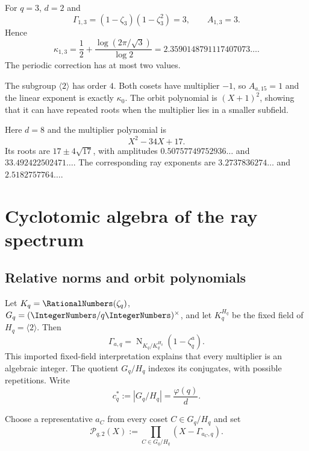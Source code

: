 \documentclass[11pt,oneside]{article}
\theoremstyle{definition}
\theoremstyle{remark}
\newcommand{\FieldNorm}{\operatorname{N}}
\begin{document}
\begin{example}
For $q=3$, $d=2$ and
\[
 \Gamma_{1,3}=(1-\zeta_3)(1-\zeta_3^2)=3,
 \qquad A_{1,3}=3.
\]
Hence
\[
 \kappa_{1,3}=\frac12+\frac{\log(2\pi/\sqrt3)}{\log2}
 =2.3590148791117407073\ldots.
\]
The periodic correction has at most two values.
\end{example}

\begin{example}[A neutral cycle at $q=15$]
The subgroup $\langle2\rangle$ has order $4$. Both cosets have multiplier $-1$,
so $A_{a,15}=1$ and the linear exponent is exactly $\kappa_0$. The orbit polynomial
is $(X+1)^2$, showing that it can have repeated roots when the multiplier lies in
a smaller subfield.
\end{example}

\begin{example}[The first visible split at $q=17$]
Here $d=8$ and the multiplier polynomial is
\[
 X^2-34X+17.
\]
Its roots are $17\pm4\sqrt{17}$, with amplitudes
$0.50757749752936\ldots$ and $33.492422502471\ldots$. The corresponding ray
exponents are $3.2737836274\ldots$ and $2.5182757764\ldots$.
\end{example}

\section{Cyclotomic algebra of the ray spectrum}\label{p2:sec:cyclotomic-algebra}

\subsection{Relative norms and orbit polynomials}

Let $K_q=\RationalNumbers(\zeta_q)$, $G_q=(\IntegerNumbers/q\IntegerNumbers)^\times$, and let $K_q^{H_q}$ be the fixed
field of $H_q=\langle2\rangle$. Then
\begin{equation}
 \Gamma_{a,q}=\FieldNorm_{K_q/K_q^{H_q}}(1-\zeta_q^a).
 \label{p2:eq:relative-norm}
\end{equation}
This imported fixed-field interpretation explains that every multiplier is an
algebraic integer. The quotient $G_q/H_q$ indexes its conjugates, with possible
repetitions. Write
\begin{equation}
 c_q^*:=|G_q/H_q|=\frac{\varphi(q)}d.
 \label{p2:eq:coset-count}
\end{equation}

\begin{definition}
Choose a representative $a_C$ from every coset $C\in G_q/H_q$ and set
\begin{equation}
 \mathscr P_{q,2}(X):=\prod_{C\in G_q/H_q}(X-\Gamma_{a_C,q}).
 \label{p2:eq:orbit-polynomial}
\end{equation}
\end{definition}
\end{document}

